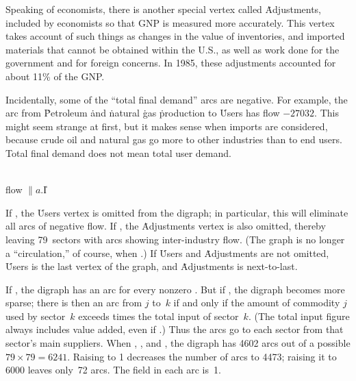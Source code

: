 Speaking of economists, there is another special vertex called
\.{Adjustments}, included by economists so that GNP is measured
more accurately. This vertex takes account of such things as changes in
the value of inventories, and imported materials that cannot be obtained
within the U.S., as well as work done for the government and for foreign
concerns. In 1985, these adjustments accounted for about 11\% of the GNP.

Incidentally, some of the ``total final demand'' arcs are negative.
For example, the arc from \.{Petroleum} \.{and} \.{natural} \.{gas}
\.{production} to \.{Users} has flow $-27032$. This might seem strange
at first, but it makes sense when imports are considered, because
crude oil and natural gas go more to other industries than to end users.
Total final demand does not mean total user demand.

\Y\B\4\D\\{flow}\5
$\|a.{}$\|I\par
\fi

If , the \.{Users} vertex is omitted from the
digraph; in
particular, this will eliminate all arcs of negative flow. If
, the \.{Adjustments} vertex is also omitted, thereby
leaving
79~sectors with arcs showing inter-industry flow. (The graph is no
longer a ``circulation,'' of course, when .)  If \.{Users}
and
\.{Adjustments} are not omitted, \.{Users} is the last vertex of the
graph, and \.{Adjustments} is next-to-last.

If , the digraph has an arc for every nonzero .
But if , the digraph becomes more sparse;
there is then an arc from $j$ to~$k$ if and
only if the amount of commodity $j$ used by sector~$k$ exceeds
 times the total input of sector~$k$.  (The total
input figure always includes value added, even if .)
Thus the arcs go to each sector from
that sector's main suppliers. When , ,
and
, the digraph has 4602 arcs out of a possible
$79\times79=6241$. Raising  to 1 decreases the number of
arcs to 4473; raising it to 6000 leaves only~72 arcs.
The  field in each arc is~1.

